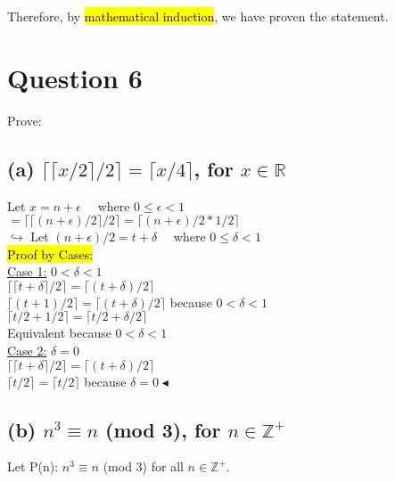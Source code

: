 \documentclass[a4paper, 12pt]{article}
\begin{document}
Therefore, by \hl{mathematical induction}, we have proven the statement.

\section*{Question 6}

Prove:

\subsection*{(a) $\lceil \lceil x/2\rceil /2\rceil = \lceil x/4 \rceil$, for $x \in \mathbb{R}$}

Let $x = n + \epsilon \quad$ where $0 \leq \epsilon < 1$\\

$=\lceil\lceil (n+\epsilon)/2\rceil/2\rceil = \lceil (n+\epsilon)/2 * 1/2\rceil$\\

$\hookrightarrow$ Let $(n+\epsilon)/2 = t + \delta \quad$ where $0 \leq \delta < 1$\\

\hl{Proof by Cases:}\\

\underline{Case 1:} $0 < \delta < 1$\\

$\lceil\lceil t + \delta \rceil/2\rceil = \lceil (t+\delta) / 2 \rceil$\\
$\lceil (t+1)/2\rceil = \lceil (t + \delta)/2\rceil$ because $0 < \delta < 1$\\
$\lceil t/2 + 1/2\rceil = \lceil t/2 + \delta /2\rceil$\\
Equivalent because $0 < \delta < 1$\\

\underline{Case 2:} $\delta = 0$\\

$\lceil\lceil t + \delta \rceil/2\rceil = \lceil (t+\delta) / 2 \rceil$\\
$\lceil t/2\rceil = \lceil t/2\rceil$ because $\delta = 0 \blacktriangleleft$\\
\newpage

\subsection*{(b) $n^3 \equiv n$ (mod 3), for $n \in \mathbb{Z^+}$}

Let P(n): $n^3 \equiv n$ (mod 3) for all $n \in \mathbb{Z^+}$.\\
\end{document}
